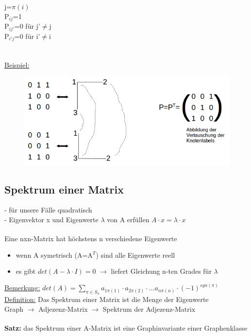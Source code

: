 j=$\pi(i)$\\
P$_{ij}$=1\\
P$_{ij'}$=0 für j'$\neq$j\\
P$_{i'j}$=0 für i'$\neq$i\\
\\\\
\underline{Beispiel:}
\begin{figure}[htp]
\centering
\includegraphics[width=1\textwidth]{lectures/161021/pix/pic13.jpg}
\end{figure}

\newpage
\subsection{Spektrum einer Matrix}
- für unsere Fälle quadratisch\\
- Eigenvektor x und Eigenwerte $\lambda$ von A erfüllen $A \cdot x = \lambda \cdot x$
\\\\
Eine nxn-Matrix hat höchstens n verschiedene Eigenwerte
\begin{itemize}
	\item wenn A symetrisch (A=A$^T$) sind alle Eigenwerte reell
	\item es gibt $det(A-\lambda \cdot I)=0$ $\rightarrow$ liefert Gleichung n-ten Grades für $\lambda$
\end{itemize}

\underline{Bemerkung:} $det(A) = \displaystyle \sum_{\pi \in S_n} a_{1 \pi (1)} \cdot a_{2 \pi (2)} \cdot ... a_{n \pi (n)} \cdot (-1)^{sgn(\pi)}$\\
\underline{Definition:} Das Spektrum einer Matrix ist die Menge der Eigenwerte\\
Graph $\rightarrow$ Adjezenz-Matrix $\rightarrow$ Spektrum der Adjezenz-Matrix
\\\\
\textbf{Satz:} das Spektrum einer A-Matrix ist eine Graphinvariante einer Graphenklasse